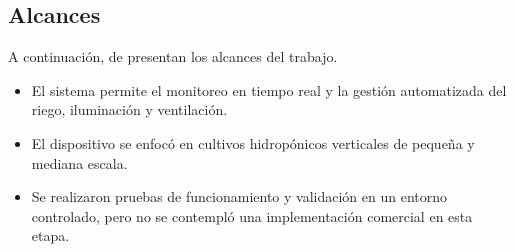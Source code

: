 \subsection{Alcances}

A continuación, de presentan los alcances del trabajo.

\begin{itemize}
    \item El sistema permite el monitoreo en tiempo real y la gestión automatizada del riego, iluminación y ventilación.
    \item El dispositivo se enfocó en cultivos hidropónicos verticales de pequeña y mediana escala.
    \item Se realizaron pruebas de funcionamiento y validación en un entorno controlado, pero no se contempló una implementación comercial en esta etapa.
\end{itemize}







